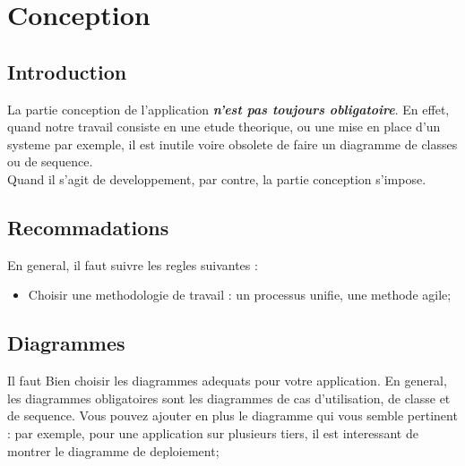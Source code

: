 
\setcounter{chapter}{1}
\chapter{Conception}
\minitoc %
\graphicspath{{Chapitre2/figures/}}


\pagestyle{fancy}
\fancyhf{}
\fancyhead[R]{\bfseries\rightmark}
\fancyfoot[R]{\thepage}
\renewcommand{\headrulewidth}{0.5pt}
\renewcommand{\footrulewidth}{0pt}
\renewcommand{\chaptermark}[1]{\markboth{\MakeUppercase{\chaptername~\thechapter. #1 }}{}}
\renewcommand{\sectionmark}[1]{\markright{\thechapter.\thesection~ #1}}

\begin{spacing}{1.2}
\section*{Introduction}
La partie conception de l'application \textbf{\textsl{n'est pas toujours obligatoire}}. En effet, quand notre travail consiste en une etude theorique, ou une mise en place d'un systeme par exemple, 
il est inutile voire obsolete de faire un diagramme de classes ou de sequence.\\
Quand il s'agit de developpement, par contre, la partie conception s'impose. 
\section{Recommadations}
En general, 
il faut suivre les regles suivantes :
\begin{itemize}
	\item Choisir une methodologie de travail : un processus unifie, une methode agile;
\end{itemize}
\section{Diagrammes}
Il faut Bien choisir les diagrammes adequats pour votre application. En general, les
diagrammes obligatoires sont les diagrammes de cas d'utilisation, de classe et de 
sequence. Vous pouvez ajouter en plus le diagramme qui vous semble pertinent :
par exemple, pour une application sur plusieurs tiers, il est interessant de
montrer le diagramme de deploiement;
\begin{itemize}


\end{itemize}
\end{spacing}
